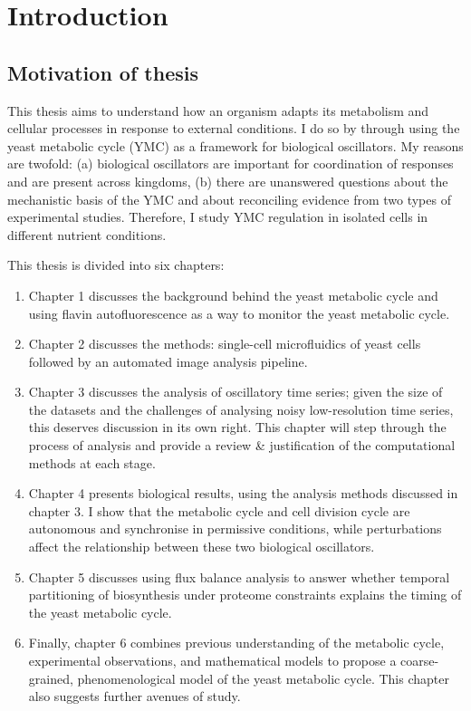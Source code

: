 
\chapter{Introduction}

\section{Motivation of thesis}

This thesis aims to understand how an organism adapts its metabolism and cellular processes in response to external conditions.
I do so by through using the yeast metabolic cycle (YMC) as a framework for biological oscillators.
My reasons are twofold: (a) biological oscillators are important for coordination of responses and are present across kingdoms, (b) there are unanswered questions about the mechanistic basis of the YMC and about reconciling evidence from two types of experimental studies.
Therefore, I study YMC regulation in isolated cells in different nutrient conditions.

This thesis is divided into six chapters:
\begin{enumerate}
  \item Chapter 1 discusses the background behind the yeast metabolic cycle and using flavin autofluorescence as a way to monitor the yeast metabolic cycle.
  \item Chapter 2 discusses the methods: single-cell microfluidics of yeast cells followed by an automated image analysis pipeline.
  \item Chapter 3 discusses the analysis of oscillatory time series; given the size of the datasets and the challenges of analysing noisy low-resolution time series, this deserves discussion in its own right.
  This chapter will step through the process of analysis and provide a review \& justification of the computational methods at each stage.
  \item Chapter 4 presents biological results, using the analysis methods discussed in chapter 3.
  I show that the metabolic cycle and cell division cycle are autonomous and synchronise in permissive conditions, while perturbations affect the relationship between these two biological oscillators.
  \item Chapter 5 discusses using flux balance analysis to answer whether temporal partitioning of biosynthesis under proteome constraints explains the timing of the yeast metabolic cycle.
  \item Finally, chapter 6 combines previous understanding of the metabolic cycle, experimental observations, and mathematical models to propose a coarse-grained, phenomenological model of the yeast metabolic cycle.
  This chapter also suggests further avenues of study.
\end{enumerate}


